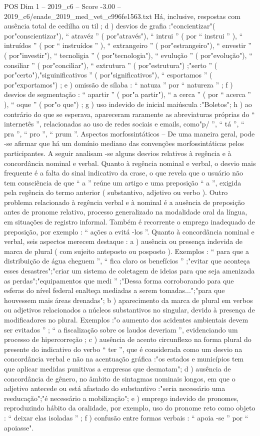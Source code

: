 \begin{textsample}{POS Dim 1 – 2019\_c6 – Score -3.00 – 2019\_c6/enade\_2019\_med\_vet\_c996fe1563.txt}
Há, inclusive, respostas com ausência total de cedilha ou til ; d ) desvios de grafia :"concientizar"( por"conscientizar"), “ atravéz ” ( por"através"), “ intrui ” ( por “ instrui ” ), “ intruídos ” ( por “ instruídos ” ), “ extrangeiro ” ( por"estrangeiro"), “ envestir ” ( por"investir"), “ tecnoligia ” ( por"tecnologia"), “ evulução ” ( por"evolução"), “ consiliar ” ( por"conciliar"), “ extrutura ” ( por"estrutura") ;"serto ” ( por"certo"),"siguinificativos ” ( por"significativos"), “ esportamos ” ( por"exportamos") ; e ) omissão de sílaba : “ natuza ” por “ natureza ” ; f ) desvios de segmentação : “ apartir ” ( por"a partir"), “ a cerca ” ( por “ acerca ” ), “ oque ” ( por"o que") ; g ) uso indevido de inicial maiúscula :"Boletos"; h ) ao contrário do que se esperava, apareceram raramente as abreviaturas próprias do “ internetês ”, relacionadas ao uso de redes sociais e emails, como"p/ ”, “ tá ”, “ pra ”, “ pro ”, “ prum ”.
Aspectos morfossintáticos – De uma maneira geral, pode -se afirmar que há um domínio mediano das convenções morfossintáticas pelos participantes.
A seguir analisam -se alguns desvios relativos à regência e à concordância nominal e verbal.
Quanto à regência nominal e verbal, o desvio mais frequente é a falta do sinal indicativo da crase, o que revela que o usuário não tem consciência de que “ a ” reúne um artigo e uma preposição “ a ”, exigida pela regência do termo anterior ( substantivo, adjetivo ou verbo ).
Outro problema relacionado à regência verbal e à nominal é a ausência de preposição antes de pronome relativo, processo generalizado na modalidade oral da língua, em situações de registro informal.
Também é recorrente o emprego inadequado de preposição, por exemplo : “ ações a evitá -los ”.
Quanto à concordância nominal e verbal, seis aspectos merecem destaque : a ) ausência ou presença indevida de marca de plural ( com sujeito anteposto ou posposto ).
Exemplos : “ para que a distribuição de água cheguem ”, “ fica claro os benefícios ” ;"evitar que aconteça esses desastres";"criar um sistema de coletagem de ideias para que seja amenizada as perdas";"equipamentos que medi ” ;"Dessa forma corroborando para que esferas do nível federal enalteça mediadas a serem tomadas...";"para que houvessem mais áreas drenadas"; b ) aparecimento da marca de plural em verbos ou adjetivos relacionados a núcleos substantivos no singular, devido à presença de modificadores no plural.
Exemplos :"o aumento dos acidentes ambientais devem ser evitados ” ; “ a fiscalização sobre os laudos deveriam ”, evidenciando um processo de hipercorreção ; c ) ausência de acento circunflexo na forma plural do presente do indicativo do verbo “ ter ”, que é considerada como um desvio na concordância verbal e não na acentuação gráfica :"os estados e municípios tem que aplicar medidas punitivas a empresas que desmatam"; d ) ausência de concordância de gênero, no âmbito de sintagmas nominais longos, em que o adjetivo antecede ou está afastado do substantivo :"seria necessário uma reeducação";"é necessário a mobilização"; e ) emprego indevido de pronomes, reproduzindo hábito da oralidade, por exemplo, uso do pronome reto como objeto : “ deixar elas isoladas ” ; f ) confusão entre formas verbais : “ apoia -se ” por “ apoiasse".

\end{textsample}
